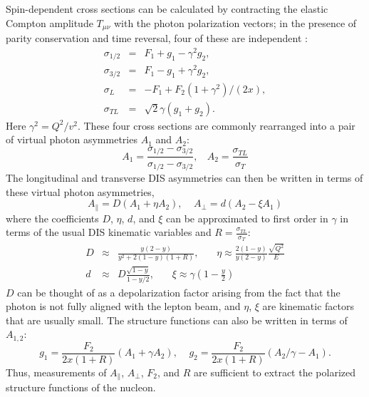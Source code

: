 Spin-dependent cross sections can be calculated by contracting the elastic Compton amplitude $T_{\mu \nu}$ with the photon polarization vectors; in the presence of parity conservation and time reversal, four of these are independent \cite{??}:
%
\begin{eqnarray}
  \sigma_{1/2} & = & F_1 + g_1 - \gamma^2 g_2, \nonumber \\
  \sigma_{3/2} & = & F_1 - g_1 + \gamma^2 g_2, \nonumber \\
  \sigma_L & = & -F_1 + F_2(1+\gamma^2)/(2x),  \nonumber \\
  \sigma_{TL} & = & \sqrt{2}\gamma (g_1+g_2).
\end{eqnarray}
%
Here $\gamma^2 = Q^2/v^2$.  These four cross sections are commonly rearranged into a pair of virtual photon asymmetries $A_1$ and $A_2$:
%
\begin{equation}
  A_1 = \frac{\sigma_{1/2} - \sigma_{3/2}}{\sigma_{1/2} - \sigma_{3/2}}, ~~~~ A_2 = \frac{\sigma_{TL}}{\sigma_T}
\end{equation}
%
The longitudinal and transverse DIS asymmetries can then be written in terms of these virtual photon asymmetries,
\begin{equation}
  A_{\parallel} = D(A_1 + \eta A_2), ~~~~~ A_{\perp} = d(A_2 - \xi A_1)
\end{equation}
%
where the coefficients $D$, $\eta$, $d$, and $\xi$ can be approximated to first order in $\gamma$ in terms of the usual DIS kinematic variables and $R = \frac{\sigma_{TL}}{\sigma_T}$:
\begin{eqnarray}
  D & \approx & \frac{y(2-y)}{y^2 + 2(1-y)(1+R)}, ~~~~~~~~ \eta \approx \frac{2(1-y)}{y(2-y)} \frac{\sqrt{Q^2}}{E} \nonumber \\
  d & \approx & D \frac{\sqrt{1-y}}{1-y/2}, ~~~~~~~~ \xi \approx \gamma(1-\frac{y}{2})
\end{eqnarray}
%
$D$ can be thought of as a depolarization factor arising from the fact that the photon is not fully aligned with the lepton beam, and $\eta$, $\xi$ are kinematic factors that are usually small.  The structure functions can also be written in terms of $A_{1,2}$:
\begin{equation}
  g_1 = \frac{F_2}{2x(1+R)}(A_1+\gamma A_2), ~~~~~ g_2 = \frac{F_2}{2x(1+R)}(A_2/\gamma - A_1).
\end{equation}
Thus, measurements of $A_{\parallel}$, $A_{\perp}$, $F_2$, and $R$ are sufficient to extract the polarized structure functions of the nucleon.



